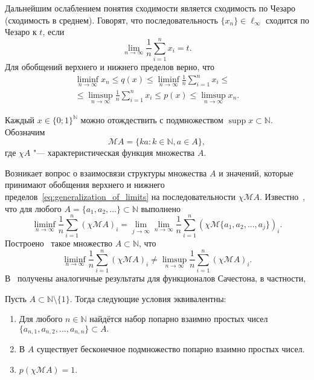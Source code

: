 Дальнейшим ослаблением понятия сходимости является сходимость по Чезаро (сходимость в среднем).
Говорят, что последовательность $\{x_n\}\in\ell_\infty$ сходится по Чезаро к $t$, если
\begin{equation*}
	\lim_{n\to\infty}\frac1{n}\sum_{i=1}^n x_i = t
	.
\end{equation*}
Для обобщений верхнего и нижнего пределов верно, что
\begin{multline}
	\label{eq:generalization_of_limits}
	\liminf_{n\to\infty} x_n \leq q(x) \leq \liminf_{n\to\infty}\frac1{n}\sum_{i=1}^n x_i
	\leq
	\\ \leq
	\limsup_{n\to\infty}\frac1{n}\sum_{i=1}^n x_i
	\leq p(x)
	\leq \limsup_{n\to\infty} x_n
	.
\end{multline}


Каждый $x\in \{0;1\}^\mathbb{N}$ можно отождествить с подмножеством
$\operatorname{supp} x \subset \mathbb{N}$.
Обозначим
\begin{equation*}
	\mathscr{M}A = \{ka: k\in\mathbb{N}, a\in A\}
	,
\end{equation*}
где $\chi A$ "--- характеристическая функция множества $A$.

Возникает вопрос о взаимосвязи структуры множества $A$
и значений, которые принимают обобщения верхнего и нижнего пределов~\eqref{eq:generalization_of_limits}
на последовательности $\chi \mathscr{M}\!A$.
Известно~\cite{davenport1951sequences}, что для любого
$A=\{a_1,a_2,...\}\subset\mathbb{N}$
выполнено
\begin{equation*}
	\liminf_{n\to\infty}\frac1{n}\sum_{i=1}^n (\chi\mathscr{M}A)_i =
	\lim_{j\to\infty}\lim_{n\to\infty}\frac1{n}\sum_{i=1}^n (\chi\mathscr{M}\{a_1,a_2,...,a_j\})_i
	.
\end{equation*}
Построено~\cite[\S 7]{besicovitch1935density} такое множество $A\subset\mathbb{N}$, что
\begin{equation}
	\liminf_{n\to\infty}\frac1{n}\sum_{i=1}^n (\chi\mathscr{M}A)_i \neq
	\limsup_{n\to\infty}\frac1{n}\sum_{i=1}^n (\chi\mathscr{M}A)_i
	.
\end{equation}
В~\cite{avdeev2021vmzprimes} получены аналогичные результаты для функционалов Сачестона,
в частности,
\begin{theorem}
	Пусть $A\subset \mathbb{N}\setminus\{1\}$.
	Тогда следующие условия эквивалентны:
	\begin{enumerate}%
		\item
			Для любого $n\in\mathbb{N}$ найдётся набор попарно взаимно простых чисел
			$
				\{a_{n,1}, a_{n,2}, ..., a_{n,n}  \} \subset A
				.
			$
		\item
			В $A$ существует бесконечное подмножество попарно взаимно простых чисел.
		\item
			$p(\chi\mathscr{M}A)=1$.
	\end{enumerate}
\end{theorem}





